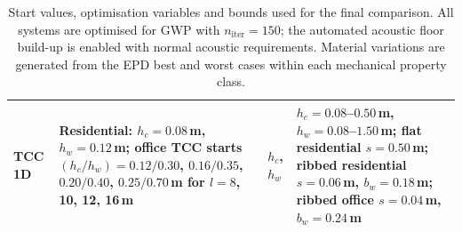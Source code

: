 \begin{table}[t]
\begin{tabularx}{\textwidth}{@{}l|X|X|X@{}}
    TCC 1D &
    Residential: $h_c=0.08$\,m, $h_w=0.12$\,m; office TCC starts $(h_c/h_w)=0.12/0.30$, $0.16/0.35$, $0.20/0.40$, $0.25/0.70$\,m for $l=8$, 10, 12, 16\,m &
    $h_c$, $h_w$ &
    $h_c=0.08$--$0.50$\,m, $h_w=0.08$--$1.50$\,m; flat residential $s=0.50$\,m; ribbed residential $s=0.06$\,m, $b_w=0.18$\,m; ribbed office $s=0.04$\,m, $b_w=0.24$\,m \\ \hline
    \end{tabularx}
    \endgroup
    \caption{Start values, optimisation variables and bounds used for the final comparison. All systems are optimised for GWP with $n_{\mathrm{iter}}=150$; the automated acoustic floor build-up is enabled with normal acoustic requirements. Material variations are generated from the EPD best and worst cases within each mechanical property class.}
\end{table}
